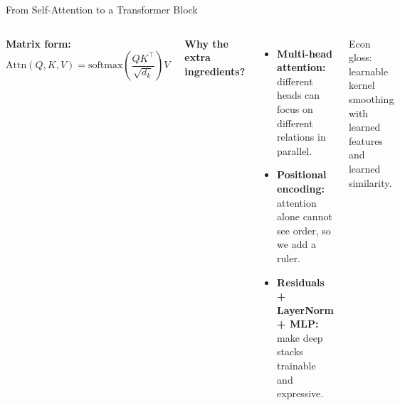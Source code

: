 \documentclass[aspectratio=169,11pt]{beamer}
\newcommand{\emphc}[1]{\textcolor{harvardcrimson}{#1}}
\begin{document}
\begin{frame}{From Self-Attention to a Transformer Block}
\footnotesize
\begin{columns}[T]
\textbf{Matrix form:}
\[
\mathrm{Attn}(Q,K,V) =
\mathrm{softmax}\!\left(\frac{QK^\top}{\sqrt{d_k}}\right)V
\]

\vspace{2pt}
\textbf{Why the extra ingredients?}
\begin{itemize}\itemsep1pt
    \item \textbf{Multi-head attention:} different heads can focus on different relations in parallel.
    \item \textbf{Positional encoding:} attention alone cannot see order, so we add a ruler.
    \item \textbf{Residuals + LayerNorm + MLP:} make deep stacks trainable and expressive.
\end{itemize}
\vspace{2pt}
{\scriptsize\emphc{Econ gloss:} learnable kernel smoothing with learned features and learned similarity.}


\end{columns}
\end{frame}
\end{document}
